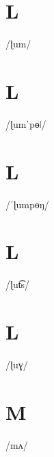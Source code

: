 \documentclass[10pt,a4paper,twoside]{book}
\begin{document}
\section*{L}

\begin{multicols}{3}
 {/ɭum/} {}
\end{multicols}

\section*{L}

\begin{multicols}{3}
 {/ɭumˈpɵǀ/} {}
\end{multicols}

\section*{L}

\begin{multicols}{3}
 {/ˈɭumpɵŋ/} {}
\end{multicols}

\section*{L}

\begin{multicols}{3}
 {/ɭut͡s/} {}
\end{multicols}

\section*{L}

\begin{multicols}{3}
 {/ɭuɣ/} {}
\end{multicols}

\section*{M}

\begin{multicols}{3}
 {/mʌ/} {}
\end{multicols}
\end{document}
